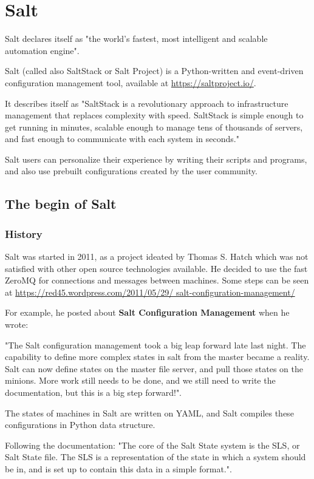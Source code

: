 \documentclass[12pt,a4paper,openright,twoside]{book}
\begin{document}
\chapter{Salt}
Salt declares itself as "the world's fastest, most intelligent and scalable automation engine"\cite{saltDocAbout}.


Salt (called also SaltStack or Salt Project) is a Python-written and event-driven configuration management tool, available at \url{https://saltproject.io/}.


It describes itself as "SaltStack is a revolutionary approach to infrastructure management that replaces complexity with speed. SaltStack is simple enough to get running in minutes, scalable enough to manage tens of thousands of servers, and fast enough to communicate with each system in seconds."\cite{saltDocStart}


Salt users can personalize their experience by writing their scripts and programs, and also use prebuilt configurations created by the user community.

\section{The begin of Salt}

\subsection{History}
Salt was started in 2011, as a project ideated by Thomas S. Hatch which was not satisfied with other open source technologies available\cite{saltFloss}. He decided to use the fast ZeroMQ for connections and messages between machines. Some steps can be seen at \url{https://red45.wordpress.com/2011/05/29/
salt-configuration-management/}


For example, he posted about \textbf{Salt Configuration Management} when he wrote:


"The Salt configuration management took a big leap forward late last night. The capability to define more complex states in salt from the master became a reality. Salt can now define states on the master file server, and pull those states on the minions. More work still needs to be done, and we still need to write the documentation, but this is a big step forward!".


The states of machines in Salt are written on YAML, and Salt compiles these configurations in Python data structure.


Following the documentation: "The core of the Salt State system is the SLS, or Salt State file. The SLS is a representation of the state in which a system should be in, and is set up to contain this data in a simple format."\cite{saltDocSLS}.
\end{document}
